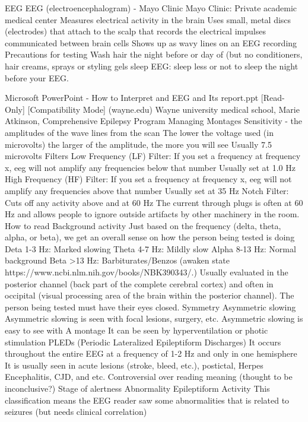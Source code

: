 \documentclass{article}
\begin{document}
EEG
EEG (electroencephalogram) - Mayo Clinic
Mayo Clinic: Private academic medical center 
Measures electrical activity in the brain
Uses small, metal discs (electrodes) that attach to the scalp that records the electrical impulses communicated between brain cells
Shows up as wavy lines on an EEG recording 
Precautions for testing 
Wash hair the night before or day of (but no conditioners, hair creams, sprays or styling gels
sleep EEG: sleep less or not to sleep the night before your EEG.

Microsoft PowerPoint - How to Interpret and EEG and Its report.ppt [Read-Only] [Compatibility Mode] (wayne.edu)
Wayne university medical school, Marie Atkinson, Comprehensive Epilepsy Program  
Managing 
Montages 
Sensitivity - the amplitudes of the wave lines from the scan
The lower the voltage used (in microvolts) the larger of the amplitude, the more you will see 
Usually 7.5 microvolts
Filters
Low Frequency (LF) Filter: 
If you set a frequency at frequency x, eeg will not amplify any frequencies below that number
Usually set at 1.0 Hz
High Frequency (HF) Filter:
If you set a frequency at frequency x, eeg will not amplify any frequencies above that number
Usually set at 35 Hz
Notch Filter:	
Cuts off any activity above and at 60 Hz
The current through plugs is often at 60 Hz and allows people to ignore outside artifacts by other machinery in the room.
How to read 
Background activity
Just based on the frequency (delta, theta, alpha, or beta), we get an overall sense on how the person being tested is doing
Deta 1-3 Hz: Marked slowing
Theta 4-7 Hz: Mildly slow 
Alpha 8-13 Hz: Normal background
Beta >13 Hz: Barbiturates/Benzos (awaken state https://www.ncbi.nlm.nih.gov/books/NBK390343/.)
Usually evaluated in the posterior channel (back part of the complete cerebral cortex) and often in occipital (visual processing area of the brain within the posterior channel).
The person being tested must have their eyes closed.
Symmetry
Asymmetric slowing
Asymmetric slowing is seen with focal lesions, surgery, etc.
Asymmetric slowing is easy to see with A montage
It can be seen by hyperventilation or photic stimulation 
PLEDs (Periodic Lateralized Epileptiform Discharges)
It occurs throughout the entire EEG at a frequency of 1-2 Hz and only in one hemisphere
It is usually seen in acute lesions (stroke, bleed, etc.), postictal, Herpes Encephalitis, CJD, and etc.
Controversial over reading meaning (thought to be inconclusive?)
Stage of alertness
Abnormality
Epileptiform Activity
This classification means the EEG reader saw some abnormalities that is related to seizures (but needs clinical correlation)
\end{document}
